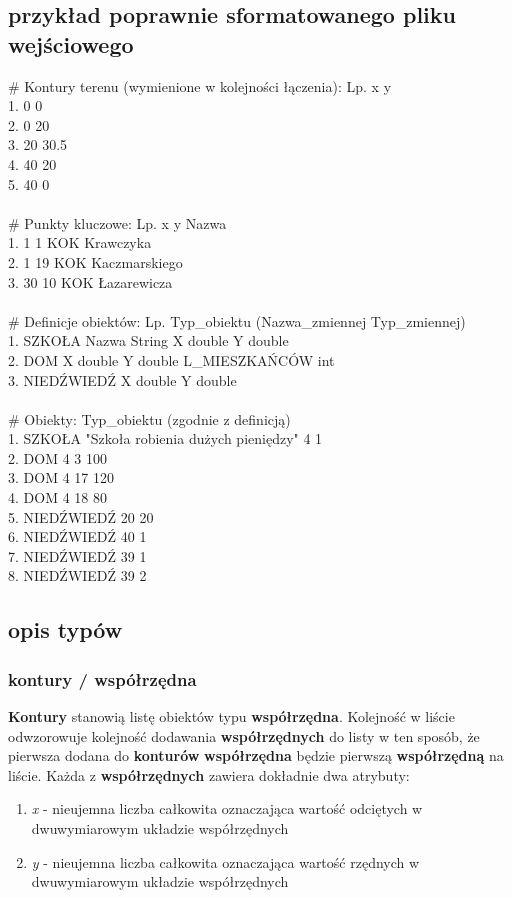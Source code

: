 \documentclass[hidelinks,10pt,a4paper]{article}
\begin{document}
\subsection{przykład poprawnie sformatowanego pliku wejściowego}
\# Kontury terenu (wymienione w kolejności łączenia): Lp. x y
\\1. 0 0
\\2. 0 20
\\3. 20 30.5
\\4. 40 20
\\5. 40 0
\\
\\
\# Punkty kluczowe: Lp. x y Nazwa
\\1. 1 1 KOK Krawczyka
\\2. 1 19 KOK Kaczmarskiego
\\3. 30 10 KOK Łazarewicza
\\
\\
\# Definicje obiektów: Lp. Typ\_obiektu (Nazwa\_zmiennej Typ\_zmiennej)
\\1. SZKOŁA Nazwa String X double Y double
\\2. DOM X double Y double L\_MIESZKAŃCÓW int
\\3. NIEDŹWIEDŹ X double Y double
\\
\\
\# Obiekty: Typ\_obiektu (zgodnie z definicją)
\\1. SZKOŁA "Szkoła robienia dużych pieniędzy" 4 1
\\2. DOM 4 3 100
\\3. DOM 4 17 120
\\4. DOM 4 18 80
\\5. NIEDŹWIEDŹ 20 20
\\6. NIEDŹWIEDŹ 40 1
\\7. NIEDŹWIEDŹ 39 1
\\8. NIEDŹWIEDŹ 39 2
\\
\subsection{opis typów}


\subsubsection{kontury / współrzędna}
\textbf{Kontury} stanowią listę obiektów typu \textbf{współrzędna}.
Kolejność w liście odwzorowuje kolejność dodawania \textbf{współrzędnych} do listy w ten sposób, że pierwsza dodana do \textbf{konturów} \textbf{współrzędna} będzie pierwszą \textbf{współrzędną} na liście. Każda z \textbf{współrzędnych} zawiera dokładnie dwa atrybuty:
\begin{enumerate}
\item \textit{x} - nieujemna liczba całkowita oznaczająca wartość odciętych w dwuwymiarowym układzie współrzędnych
\item \textit{y} - nieujemna liczba całkowita oznaczająca wartość rzędnych w dwuwymiarowym układzie współrzędnych
\end{enumerate}
\end{document}
